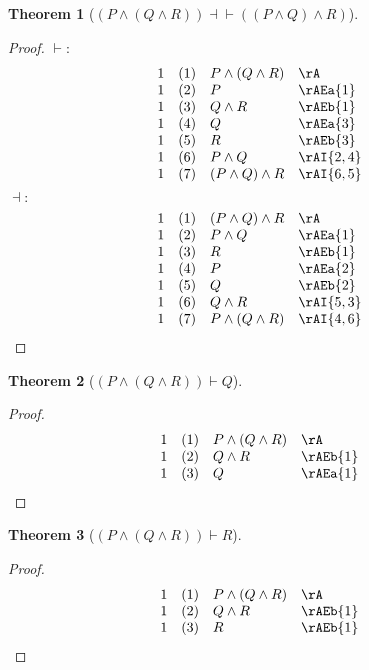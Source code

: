 \documentclass{book}
\theoremstyle{plain}
\newtheorem{theorem}{Theorem}
\theoremstyle{remark}
\theoremstyle{definition}
\begin{document}
\label{PAndLpQAndRRpImpLpPAndQRpAndQ}
\begin{theorem}[\( (P \land (Q \land R)) \dashv\vdash ((P \land Q) \land R) \)]
\end{theorem}

\begin{proof}
	\(\vdash:\)
	\[
	\begin{array}{llll}
		1 & (1) & P \land (Q \land R) & \rA \\
		1 & (2) & P & \rAEa{1} \\
		1 & (3) & Q \land R & \rAEb{1} \\
		1 & (4) & Q & \rAEa{3}  \\
		1 & (5) & R & \rAEb{3}  \\
		1 & (6) & P \land Q & \rAI{2,4}  \\
		1 & (7) & (P \land Q) \land R & \rAI{6,5} \\
	\end{array}
	\]
	\(\dashv:\)
	\[
	\begin{array}{llll}
		1 & (1) & (P \land Q) \land R & \rA \\
		1 & (2) & P \land Q & \rAEa{1} \\
		1 & (3) & R & \rAEb{1} \\
		1 & (4) & P & \rAEa{2}\\
		1 & (5) & Q & \rAEb{2} \\
		1 & (6) & Q \land R & \rAI{5,3} \\
		1 & (7) & P \land (Q \land R) & \rAI{4,6}\\
	\end{array}
	\]
\end{proof}

\label{PAndLpQAndRRpRpImpQ}
\begin{theorem}[\( (P \land (Q \land R))\vdash Q \)]
\end{theorem}
\begin{proof}
	\[
	\begin{array}{llll}
		1 & (1) & P \land (Q \land R) & \rA \\
		1 & (2) & Q\land R & \rAEb{1} \\
		1 & (3) & Q  & \rAEa{1} \\
	\end{array}
	\]
\end{proof}

\label{LpPAndLpQAndRRpRpImpR}
\begin{theorem}[\( (P \land (Q \land R))\vdash R \)]
\end{theorem}
\begin{proof}
	\[
	\begin{array}{llll}
		1 & (1) & P \land (Q \land R) & \rA \\
		1 & (2) & Q\land R & \rAEb{1} \\
		1 & (3) & R  & \rAEb{1} \\
	\end{array}
	\]
\end{proof}
\end{document}

